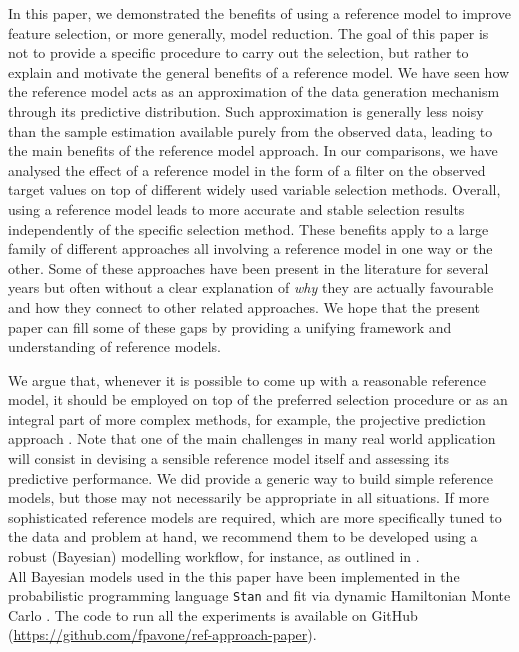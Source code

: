 \documentclass[american,]{article}
\theoremstyle{definition}
\begin{document}
In this paper, we demonstrated the benefits of using a reference model
to improve feature selection, or more generally, model reduction. The
goal of this paper is not to provide a specific procedure to carry out
the selection, but rather to explain and motivate the general benefits
of a reference model.  We have seen how the reference model acts as an
approximation of the data generation mechanism through its predictive
distribution. Such approximation is generally less noisy than the
sample estimation available purely from the observed data, leading to
the main benefits of the reference model approach. In our comparisons,
we have analysed the effect of a reference model in the form of a
filter on the observed target values on top of different widely used
variable selection methods. Overall, using a reference model leads to
more accurate and stable selection results independently of the
specific selection method. These benefits apply to a large family of
different approaches all involving a reference model in one way or the
other. Some of these approaches have been present in the literature
for several years \cite[e.g. see][]{vehtari2012survey,paper:projpred}
but often without a clear explanation of \emph{why} they are actually
favourable and how they connect to other related approaches. We hope
that the present paper can fill some of these gaps by providing a
unifying framework and understanding of reference models.

We argue that, whenever it is possible to come up with a reasonable
reference model, it should be employed on top of the preferred
selection procedure or as an integral part of more complex methods,
for example, the projective prediction approach
\citep{paper:projpred}. Note that one of the main challenges in many
real world application will consist in devising a sensible reference
model itself and assessing its predictive performance. We did provide
a generic way to build simple reference models, but those may not
necessarily be appropriate in all situations. If more sophisticated
reference models are required, which are more specifically tuned to
the data and problem at hand, we recommend them to be developed using
a robust (Bayesian) modelling workflow, for instance, as outlined in
\cite{gabry2019visualization}.
\\

All Bayesian models used in the this paper have been implemented in
the probabilistic programming language \texttt{Stan}
\citep{paper:stan} and fit via dynamic Hamiltonian Monte Carlo
\citep{hoffman2014no,betancourt2017conceptual}. The code to run all
the experiments is available on GitHub
(\url{https://github.com/fpavone/ref-approach-paper}).
\end{document}
